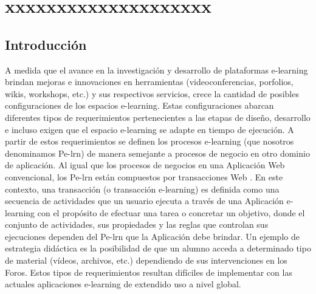 \chapter{xxxxxxxxxxxxxxxxxxxx} \label{cap:frameworkx} \label{cap:6x}



\section {Introducción} \label{intro}

A medida que el avance en la investigación y desarrollo de plataformas
e-learning brindan mejoras e innovaciones en herramientas
(videoconferencias, porfolios, wikis, workshops, etc.) y sus respectivos
servicios, crece la cantidad de posibles configuraciones de los espacios
e-learning. Estas configuraciones abarcan diferentes tipos de requerimientos
pertenecientes a las etapas de diseño, desarrollo e incluso exigen que el
espacio e-learning se adapte en tiempo de ejecución. A partir de estos
requerimientos se definen los procesos e-learning (que nosotros denominamos
Pe-lrn) \cite{tweb} de manera semejante a procesos de negocio en otro dominio de
aplicación. Al igual que los procesos de negocios en una Aplicación Web
convencional, los Pe-lrn están compuestos por transacciones Web \cite{}. En este
contexto, una transacción (o transacción e-learning) es definida como una
secuencia de actividades que un usuario ejecuta a través de una Aplicación
e-learning con el propósito de efectuar una tarea o concretar un objetivo, donde
el conjunto de actividades, sus propiedades y las reglas que controlan sus
ejecuciones dependen del Pe-lrn que la Aplicación debe brindar. Un ejemplo de
estrategia didáctica es la posibilidad de que un alumno acceda a determinado
tipo de material (vídeos, archivos, etc.)  dependiendo de sus intervenciones en
los Foros. Estos tipos de requerimientos resultan difíciles de implementar con
las actuales aplicaciones e-learning de extendido uso a nivel global. 
